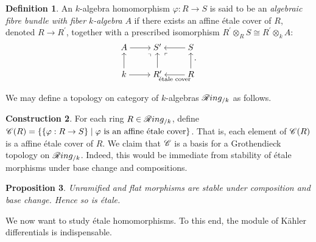 \documentclass[letterpaper,10pt,twoside]{amsart}
\newcommand{\cat}[1]{\mathscr{\StrChar{#1}{1}}\StrGobbleLeft{#1}{1}}
\newcommand{\isom}{\cong}
\newcommand{\tens}{\otimes}
\theoremstyle{proposition}
\newtheorem{proposition}{Proposition}[section]
\theoremstyle{definition}
\newtheorem{definition}[proposition]{Definition}
\theoremstyle{theorem}
\theoremstyle{definition}
\theoremstyle{definition}
\theoremstyle{definition}
\theoremstyle{lemma}
\theoremstyle{definition}
\theoremstyle{definition}
\newtheorem{construct}[proposition]{Construction}
\theoremstyle{corollary}
\theoremstyle{definition}
\begin{document}
	\begin{definition}
		An $k$-algebra homomorphism $\varphi :R\to S$ is said to be an \textit{algebraic fibre bundle with fiber $k$-algebra }$A$ if there exists an affine \'etale cover of $R$, denoted $R\to R^{\prime}$, together with a prescribed isomorphism $ R^{\prime}\tens_{R} S \isom R^{\prime}\tens_{k} A$:
		\[\begin{tikzcd}[cramped]
			A & {S^\prime} & S \\
			k & {R^\prime} & R
			\arrow[from=1-1, to=1-2]
			\arrow["\ulcorner"{anchor=center, pos=0.125, rotate=-90}, draw=none, from=1-2, to=2-1]
			\arrow["\ulcorner"{anchor=center, pos=0.125}, draw=none, from=1-2, to=2-3]
			\arrow[from=1-3, to=1-2]
			\arrow[from=2-1, to=1-1]
			\arrow[from=2-1, to=2-2]
			\arrow[from=2-2, to=1-2]
			\arrow[from=2-3, to=1-3]
			\arrow["{\text{\'etale cover}}", from=2-3, to=2-2]
		\end{tikzcd}.\]
	\end{definition}
	We may define a topology on category of $k$-algebras $\cat{Ring}_{/k}$ as follows.
	\begin{construct}
		For each ring $R \in \cat{Ring}_{/k}$, define $\cat{C}(R) = \{\{\varphi: R\to S\}\;\vert\;\varphi\text{ is an affine \'etale cover}\}$. That is, each element of $\cat{C}(R)$ is a affine \'etale cover of $R$. We claim that $\cat{C}$ is a basis for a Grothendieck topology on $\cat{Ring}_{/k}$. Indeed, this would be immediate from stability of \'etale morphisms under base change and compositions. 
	\end{construct}
	\begin{proposition}
		Unramified and flat morphisms are stable under composition and base change. Hence so is \'etale.
	\end{proposition}
	
	
	We now want to study \'etale homomorphisms. To this end, the module of K\"ahler differentials is indispensable. 
\end{document}
